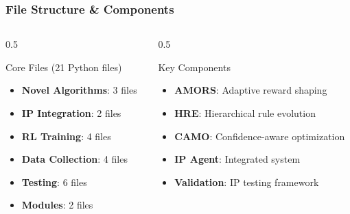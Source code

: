 \documentclass{beamer}
\begin{document}
\begin{frame}
\frametitle{File Structure \& Components}
\begin{columns}
\begin{column}{0.5\textwidth}
\begin{block}{Core Files (21 Python files)}
\begin{itemize}
\item \textbf{Novel Algorithms}: 3 files
\item \textbf{IP Integration}: 2 files
\item \textbf{RL Training}: 4 files
\item \textbf{Data Collection}: 4 files
\item \textbf{Testing}: 6 files
\item \textbf{Modules}: 2 files
\end{itemize}
\end{block}
\end{column}
\begin{column}{0.5\textwidth}
\begin{block}{Key Components}
\begin{itemize}
\item \textbf{AMORS}: Adaptive reward shaping
\item \textbf{HRE}: Hierarchical rule evolution
\item \textbf{CAMO}: Confidence-aware optimization
\item \textbf{IP Agent}: Integrated system
\item \textbf{Validation}: IP testing framework
\end{itemize}
\end{block}
\end{column}
\end{columns}
\end{frame}
\end{document}
